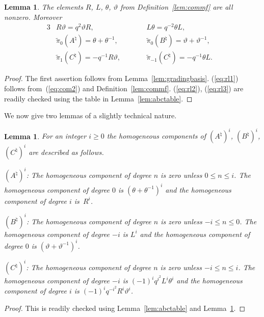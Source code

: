 \documentclass[11pt]{article}
\numberwithin{equation}{section}
\newtheorem{Lemma}[Theorem]{Lemma}
\begin{document}
\begin{Lemma}
\label{lem:comm}
The elements $R$, $L$, $\theta$, $\vartheta$ from
Definition~{\rm \ref{lem:commf}}
are all nonzero. Moreover
\begin{alignat}{3}
& R \vartheta = q^2 \vartheta R,
\qquad &&
L \theta = q^{-2} \theta L, &
\label{eq:rl1}
\\
&\tilde \pi_{0}(A^\natural) = \theta + \theta^{-1},
\qquad && \tilde \pi_{0}(B^\natural) = \vartheta + \vartheta^{-1}, &
\label{eq:rl2}
\\
&
\tilde \pi_{1}(C^\natural) =
-q^{-1} R \vartheta,
\qquad &&
\tilde \pi_{-1}(C^\natural) =
-q^{-1} \theta L.&
\label{eq:rl3}
\end{alignat}
\end{Lemma}
\begin{proof}
The f\/irst assertion
follows from
Lemma~\ref{lem:gradingbasis}.
(\ref{eq:rl1}) follows from~(\ref{eq:com2}) and
Def\/inition~\ref{lem:commf}.
(\ref{eq:rl2}),
(\ref{eq:rl3}) are readily checked using
the table in Lemma~\ref{lem:abctable}.
\end{proof}

We now give two lemmas of a slightly technical
nature.

\begin{Lemma}
\label{lem:aproj}
For an integer $i \geq 0$ the homogeneous components of
$
(A^\natural)^i$,
$(B^\natural)^i$,
$(C^\natural)^i$ are described as follows.

 $(A^\natural)^i$:
The homogeneous component of degree $n$ is zero unless
$0\leq n \leq i$.
The homogeneous component of degree $0$ is
$(\theta + \theta^{-1})^i$
and the homogeneous component of degree $i$ is~$R^i$.

 $(B^\natural)^i$:
The homogeneous component of degree $n$ is zero unless
$-i\leq n \leq 0$.
The homogeneous component of degree $-i$ is
$L^i$
and the
homogeneous component of degree $0$ is
$(\vartheta+ \vartheta^{-1})^i$.

$(C^\natural)^i$:
The homogeneous component of degree $n$ is zero unless
$-i\leq n \leq i$.
The homogeneous component of degree $-i$ is
$(-1)^iq^{i^2}L^i \theta^i$ and the
homogeneous component of degree $i$ is
$(-1)^iq^{-i^2}R^i \vartheta^i$.
\end{Lemma}
\begin{proof}
This is readily checked using
Lemma~\ref{lem:abctable} and
Lemma~\ref{lem:comm}.
\end{proof}
\end{document}
